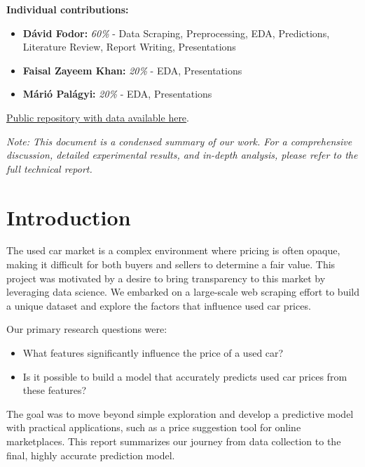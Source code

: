\documentclass[12pt]{article}
\begin{document}
\vfill

\textbf{Individual contributions:}
\begin{itemize}
  \item \textbf{Dávid Fodor:} \textit{60\%} - Data Scraping, Preprocessing, EDA, Predictions, Literature Review, Report Writing, Presentations
  \item \textbf{Faisal Zayeem Khan:} \textit{20\%} - EDA, Presentations
  \item \textbf{Márió Palágyi:} \textit{20\%} - EDA, Presentations
\end{itemize}

\vspace{1em}
\href{https://github.com/dfoddav2/SS25-capstone-project}{Public repository with data available here}.

\vspace{2em}
\textit{Note: This document is a condensed summary of our work. For a comprehensive discussion, detailed experimental results, and in-depth analysis, please refer to the full technical report.}

\newpage
\tableofcontents

\newpage
\section{Introduction}

The used car market is a complex environment where pricing is often opaque, making it difficult for both buyers and sellers to determine a fair value. This project was motivated by a desire to bring transparency to this market by leveraging data science. We embarked on a large-scale web scraping effort to build a unique dataset and explore the factors that influence used car prices.

Our primary research questions were:
\begin{itemize}
  \item What features significantly influence the price of a used car?
  \item Is it possible to build a model that accurately predicts used car prices from these features?
\end{itemize}

The goal was to move beyond simple exploration and develop a predictive model with practical applications, such as a price suggestion tool for online marketplaces. This report summarizes our journey from data collection to the final, highly accurate prediction model.

\newpage
\end{document}
